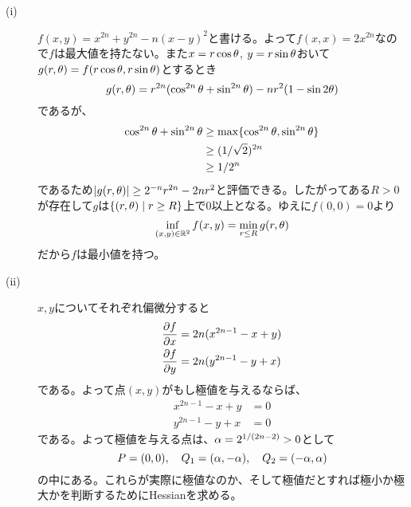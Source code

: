 \subsubsection{}%
\begin{sol} ${}$
  \begin{description}
    \item[(i)] $f(x,y) = x^{2n} + y^{2n} - n(x-y)^2$と書ける。よって$f(x,x) = 2x^{2n}$なので$f$は最大値を持たない。また$x=r \cos {\theta}$, $y = r \sin {\theta}$おいて$g(r,{\theta}) = f(r \cos {\theta}, r \sin {\theta})$とするとき
    \[
    g(r,{\theta})=r^{2n} (\cos^{2n} {\theta} + \sin^{2n} {\theta}) - nr^2 (1- \sin 2{\theta})
    \]
    であるが、
    \begin{align*}
      \cos^{2n} {\theta} + \sin^{2n} {\theta} &\geq \max\{ \cos^{2n} {\theta} , \sin^{2n} {\theta} \} \\
      &\geq (1/\sqrt{2})^{2n} \\
      &\geq 1/2^n
    \end{align*}
    であるため$\left \lvert g(r,{\theta}) \right \rvert \geq 2^{-n} r^{2n} - 2nr^2$と評価できる。したがってある$R>0$が存在して$g$は$\left\{ (r,{\theta}) \mathrel{} \middle| \mathrel{} r \geq R \right\}$上で$0$以上となる。ゆえに$f(0,0)=0$より
    \[
    \inf_{(x,y) \in {\mathbb R}^2} f(x,y) = \min_{r \leq R} g(r,{\theta})
    \]
    だから$f$は最小値を持つ。
    \item[(ii)] $x,y$についてそれぞれ偏微分すると
    \begin{align*}
      \frac{\partial f}{\partial x} &= 2n (x^{2n-1} - x + y) \\
      \frac{\partial f}{\partial y} &= 2n (y^{2n-1} - y + x)
    \end{align*}
    である。よって点$(x,y)$がもし極値を与えるならば、
    \begin{align*}
      x^{2n-1} - x + y &= 0 \\
      y^{2n-1} - y + x &= 0
    \end{align*}
    である。よって極値を与える点は、${\alpha} = 2^{1/(2n-2)} > 0$として
    \[
    P = (0,0) , \quad Q_1 = ({\alpha}, - {\alpha}), \quad Q_2 =  (-{\alpha}, {\alpha})
    \]
    の中にある。これらが実際に極値なのか、そして極値だとすれば極小か極大かを判断するためにHessianを求める。
    \begin{align*}

\end{align*}
\end{description}
\end{sol}
